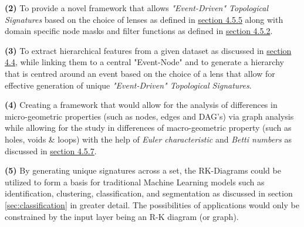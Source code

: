   \textbf{(2)} To provide a novel framework that allows \textit{"Event-Driven" Topological Signatures} based on the choice of  lenses  as defined in \hyperref[sec:sectionlens]{section 4.5.5} along with domain specific node masks and filter functions as defined in  \hyperref[sec:Filters]{section 4.5.2}.
  
  \textbf{(3)} To extract hierarchical features from a given dataset as discussed in \hyperref[sec:HEF]{section 4.4}, while linking them to a central "Event-Node" and to generate a hierarchy that is centred around an event based on the choice of a lens that allow for effective generation of unique \textit{"Event-Driven" Topological Signatures}.
  
  \textbf{(4)} Creating a framework that would allow for the analysis of differences in micro-geometric properties (such as nodes, edges and DAG's) via graph analysis while allowing for the study in differences of macro-geometric property (such as holes, voids \& loops) with the help of \textit{Euler characteristic} and \textit{Betti numbers} as discussed in \hyperref[sec:BettiNumber]{section 4.5.7}.
  
  \textbf{(5)} By generating unique signatures across a set, the RK-Diagrams could be utilized to form a basis for traditional Machine Learning models such as identification, clustering, classification, and segmentation as discussed in section \ref{sec:classification} in greater detail. The possibilities of applications would only be constrained by the input layer being an R-K diagram (or graph).

